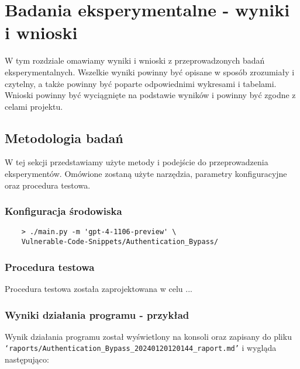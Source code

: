 \chapter{Badania eksperymentalne - wyniki i wnioski}
\label{ch:badania_eksperymentalne}

W tym rozdziale omawiamy wyniki i wnioski z przeprowadzonych badań eksperymentalnych. Wszelkie wyniki powinny być opisane w sposób zrozumiały i czytelny, a także powinny być poparte odpowiednimi wykresami i tabelami. Wnioski powinny być wyciągnięte na podstawie wyników i powinny być zgodne z celami projektu.

\section{Metodologia badań}
\label{sec:metodologia_badan}

W tej sekcji przedstawiamy użyte metody i podejście do przeprowadzenia eksperymentów. Omówione zostaną użyte narzędzia, parametry konfiguracyjne oraz procedura testowa.

\subsection{Konfiguracja środowiska}
\label{subsec:konfiguracja_srodowiska}

\begin{verbatim}
    > ./main.py -m 'gpt-4-1106-preview' \
    Vulnerable-Code-Snippets/Authentication_Bypass/
\end{verbatim}

\subsection{Procedura testowa}
\label{subsec:procedura_testowa}

Procedura testowa została zaprojektowana w celu ...

\subsection{Wyniki działania programu - przykład}
\label{subsec:wyniki_dzialania_programu}

Wynik działania programu został wyświetlony na konsoli oraz zapisany do pliku \texttt{`raports/Authentication_Bypass_20240120120144_raport.md'} i wygląda następująco:



